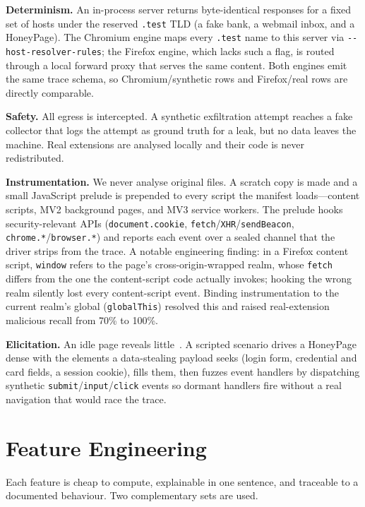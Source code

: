 \documentclass[conference]{IEEEtran}
\begin{document}
\noindent\textbf{Determinism.} An in-process server returns byte-identical responses for a fixed
set of hosts under the reserved \texttt{.test} TLD (a fake bank, a webmail inbox, and a
HoneyPage). The Chromium engine maps every \texttt{.test} name to this server via
\texttt{-{}-host-resolver-rules}; the Firefox engine, which lacks such a flag, is routed through a
local forward proxy that serves the same content. Both engines emit the same trace schema, so
Chromium/synthetic rows and Firefox/real rows are directly comparable.

\noindent\textbf{Safety.} All egress is intercepted. A synthetic exfiltration attempt reaches a
fake collector that logs the attempt as ground truth for a leak, but no data leaves the machine.
Real extensions are analysed locally and their code is never redistributed.

\noindent\textbf{Instrumentation.} We never analyse original files. A scratch copy is made and a
small JavaScript prelude is prepended to every script the manifest loads---content scripts, MV2
background pages, and MV3 service workers. The prelude hooks security-relevant APIs
(\texttt{document.cookie}, \texttt{fetch}/\texttt{XHR}/\texttt{sendBeacon},
\texttt{chrome.*}/\texttt{browser.*}) and reports each event over a sealed channel that the driver
strips from the trace. A notable engineering finding: in a Firefox content script,
\texttt{window} refers to the page's cross-origin-wrapped realm, whose \texttt{fetch} differs from
the one the content-script code actually invokes; hooking the wrong realm silently lost every
content-script event. Binding instrumentation to the current realm's global
(\texttt{globalThis}) resolved this and raised real-extension malicious recall from 70\% to 100\%.

\noindent\textbf{Elicitation.} An idle page reveals little~\cite{hulk}. A scripted scenario drives
a HoneyPage dense with the elements a data-stealing payload seeks (login form, credential and
card fields, a session cookie), fills them, then fuzzes event handlers by dispatching synthetic
\texttt{submit}/\texttt{input}/\texttt{click} events so dormant handlers fire without a real
navigation that would race the trace.

\section{Feature Engineering}
Each feature is cheap to compute, explainable in one sentence, and traceable to a documented
behaviour. Two complementary sets are used.
\end{document}
